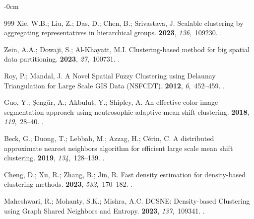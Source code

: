 \documentclass[information,article,accept,pdftex,moreauthors]{Definitions/mdpi}
\begin{document}
\begin{adjustwidth}{-\extralength}{0cm}
\begin{thebibliography}{999}
Xie, W.B.; Liu, Z.; Das, D.; Chen, B.; Srivastava, J.
\newblock Scalable clustering by aggregating representatives in hierarchical
  groups.
 {\bf 2023}, {\em 136},~109230.
.

Zein, A.A.; Dowaji, S.; Al-Khayatt, M.I.
\newblock Clustering-based method for big spatial data partitioning.
 {\bf 2023}, {\em 27},~100731.
.

Roy, P.; Mandal, J.
\newblock A Novel Spatial Fuzzy Clustering using Delaunay Triangulation for
  Large Scale GIS Data (NSFCDT).
 {\bf 2012}, {\em 6},~452--459.
.

Guo, Y.; Şengür, A.; Akbulut, Y.; Shipley, A.
\newblock An effective color image segmentation approach using neutrosophic
  adaptive mean shift clustering.
 {\bf 2018}, {\em 119},~28--40.
.

Beck, G.; Duong, T.; Lebbah, M.; Azzag, H.; Cérin, C.
\newblock A distributed approximate nearest neighbors algorithm for efficient
  large scale mean shift clustering.
 {\bf 2019}, {\em
  134},~128--139.
.

Cheng, D.; Xu, R.; Zhang, B.; Jin, R.
\newblock Fast density estimation for density-based clustering methods.
 {\bf 2023}, {\em 532},~170--182.
.

Maheshwari, R.; Mohanty, S.K.; Mishra, A.C.
\newblock DCSNE: Density-based Clustering using Graph Shared Neighbors and
  Entropy.
 {\bf 2023}, {\em 137},~109341.
.


\end{thebibliography}
\end{adjustwidth}
\end{document}
